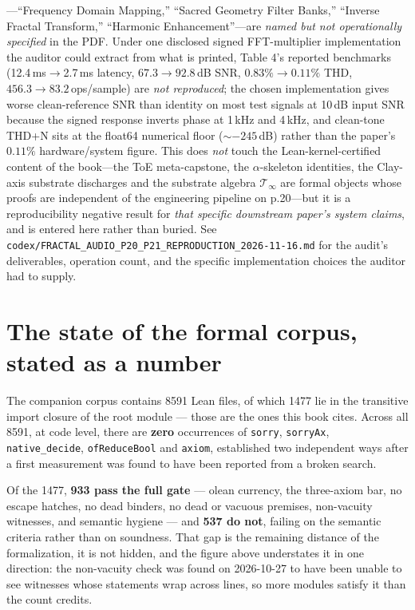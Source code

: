 \begin{itemize}
---``Frequency Domain Mapping,'' ``Sacred Geometry Filter Banks,'' ``Inverse
Fractal Transform,'' ``Harmonic Enhancement''---are \emph{named but not
operationally specified} in the PDF. Under one disclosed signed
FFT-multiplier implementation the auditor could extract from what is printed,
Table 4's reported benchmarks (12.4\,ms$\to$2.7\,ms latency,
$67.3\to 92.8$\,dB SNR, $0.83\%\to 0.11\%$ THD, $456.3\to 83.2$\,ops/sample)
are \emph{not reproduced}; the chosen implementation gives worse
clean-reference SNR than identity on most test signals at 10\,dB input SNR
because the signed response inverts phase at 1\,kHz and 4\,kHz, and clean-tone
THD+N sits at the float64 numerical floor ($\sim-245$\,dB) rather than the
paper's $0.11\%$ hardware/system figure. This does \emph{not} touch the
Lean-kernel-certified content of the book---the ToE meta-capstone, the
$\alpha$-skeleton identities, the Clay-axis substrate discharges and the
substrate algebra $\mathcal{T}_\infty$ are formal objects whose proofs are
independent of the engineering pipeline on p.20---but it is a reproducibility
negative result for \emph{that specific downstream paper's system claims}, and
is entered here rather than buried. See
\texttt{codex/FRACTAL\_AUDIO\_P20\_P21\_REPRODUCTION\_2026-11-16.md} for the
audit's deliverables, operation count, and the specific implementation
choices the auditor had to supply.
\end{itemize}

\section*{The state of the formal corpus, stated as a number}

The companion corpus contains 8591 Lean files, of which 1477 lie in the
transitive import closure of the root module --- those are the ones this book
cites. Across all 8591, at code level, there are \textbf{zero} occurrences of
\texttt{sorry}, \texttt{sorryAx}, \texttt{native\_decide},
\texttt{ofReduceBool} and \texttt{axiom}, established two independent ways
after a first measurement was found to have been reported from a broken search.

Of the 1477, \textbf{933 pass the full gate} --- olean currency, the
three-axiom bar, no escape hatches, no dead binders, no dead or vacuous
premises, non-vacuity witnesses, and semantic hygiene --- and \textbf{537 do
not}, failing on the semantic criteria rather than on soundness. That gap is the
remaining distance of the formalization, it is not hidden, and the
figure above understates it in one direction: the non-vacuity check was found on
2026-10-27 to have been unable to see witnesses whose statements wrap across
lines, so more modules satisfy it than the count credits.

